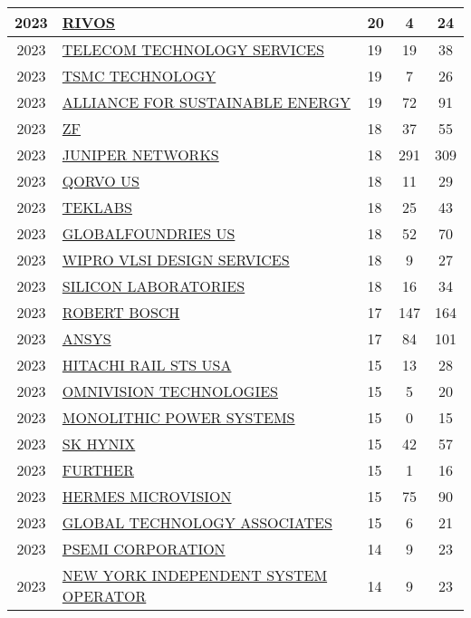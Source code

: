 \documentclass{article}%
\begin{document}
\begin{longtable}{c|p{20em}|p{5em}|c|c}
\hline%
2023&\hyperref[subsec:RIVOS]{RIVOS}&20&4&24\\%
\hline%
2023&\hyperref[subsec:TELECOMTECHNOLOGYSERVICES]{TELECOM TECHNOLOGY SERVICES}&19&19&38\\%
\hline%
2023&\hyperref[subsec:TSMCTECHNOLOGY]{TSMC TECHNOLOGY}&19&7&26\\%
\hline%
2023&\hyperref[subsec:ALLIANCEFORSUSTAINABLEENERGY]{ALLIANCE FOR SUSTAINABLE ENERGY}&19&72&91\\%
\hline%
2023&\hyperref[subsec:ZF]{ZF}&18&37&55\\%
\hline%
2023&\hyperref[subsec:JUNIPERNETWORKS]{JUNIPER NETWORKS}&18&291&309\\%
\hline%
2023&\hyperref[subsec:QORVOUS]{QORVO US}&18&11&29\\%
\hline%
2023&\hyperref[subsec:TEKLABS]{TEKLABS}&18&25&43\\%
\hline%
2023&\hyperref[subsec:GLOBALFOUNDRIESUS]{GLOBALFOUNDRIES US}&18&52&70\\%
\hline%
2023&\hyperref[subsec:WIPROVLSIDESIGNSERVICES]{WIPRO VLSI DESIGN SERVICES}&18&9&27\\%
\hline%
2023&\hyperref[subsec:SILICONLABORATORIES]{SILICON LABORATORIES}&18&16&34\\%
\hline%
2023&\hyperref[subsec:ROBERTBOSCH]{ROBERT BOSCH}&17&147&164\\%
\hline%
2023&\hyperref[subsec:ANSYS]{ANSYS}&17&84&101\\%
\hline%
2023&\hyperref[subsec:HITACHIRAILSTSUSA]{HITACHI RAIL STS USA}&15&13&28\\%
\hline%
2023&\hyperref[subsec:OMNIVISIONTECHNOLOGIES]{OMNIVISION TECHNOLOGIES}&15&5&20\\%
\hline%
2023&\hyperref[subsec:MONOLITHICPOWERSYSTEMS]{MONOLITHIC POWER SYSTEMS}&15&0&15\\%
\hline%
2023&\hyperref[subsec:SKHYNIX]{SK HYNIX}&15&42&57\\%
\hline%
2023&\hyperref[subsec:FURTHER]{FURTHER}&15&1&16\\%
\hline%
2023&\hyperref[subsec:HERMESMICROVISION]{HERMES MICROVISION}&15&75&90\\%
\hline%
2023&\hyperref[subsec:GLOBALTECHNOLOGYASSOCIATES]{GLOBAL TECHNOLOGY ASSOCIATES}&15&6&21\\%
\hline%
2023&\hyperref[subsec:PSEMICORPORATION]{PSEMI CORPORATION}&14&9&23\\%
\hline%
2023&\hyperref[subsec:NEWYORKINDEPENDENTSYSTEMOPERATOR]{NEW YORK INDEPENDENT SYSTEM OPERATOR}&14&9&23\\%

\end{longtable}
\end{document}
